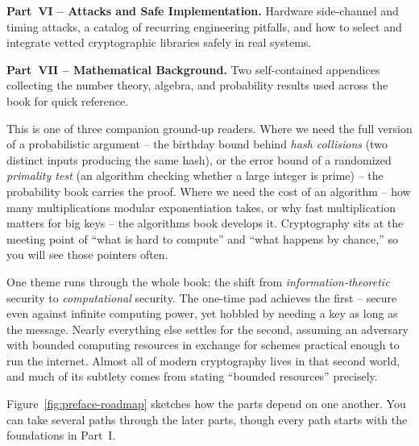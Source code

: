 \textbf{Part~VI -- Attacks and Safe Implementation.} Hardware side-channel and timing attacks, a catalog of recurring engineering pitfalls, and how to select and integrate vetted cryptographic libraries safely in real systems.

\textbf{Part~VII -- Mathematical Background.} Two self-contained appendices collecting the number theory, algebra, and probability results used across the book for quick reference.

\begin{connectionbox}
This is one of three companion ground-up readers. Where we need the full version of a probabilistic argument -- the birthday bound behind \emph{hash collisions} (two distinct inputs producing the same hash), or the error bound of a randomized \emph{primality test} (an algorithm checking whether a large integer is prime) -- the probability book carries the proof. Where we need the cost of an algorithm -- how many multiplications modular exponentiation takes, or why fast multiplication matters for big keys -- the algorithms book develops it. Cryptography sits at the meeting point of ``what is hard to compute'' and ``what happens by chance,'' so you will see those pointers often.
\end{connectionbox}

\begin{focusbox}
One theme runs through the whole book: the shift from \emph{information-theoretic} security to \emph{computational} security. The one-time pad achieves the first -- secure even against infinite computing power, yet hobbled by needing a key as long as the message. Nearly everything else settles for the second, assuming an adversary with bounded computing resources in exchange for schemes practical enough to run the internet. Almost all of modern cryptography lives in that second world, and much of its subtlety comes from stating ``bounded resources'' precisely.
\end{focusbox}

Figure~\ref{fig:preface-roadmap} sketches how the parts depend on one another. You can take several paths through the later parts, though every path starts with the foundations in Part~I.

